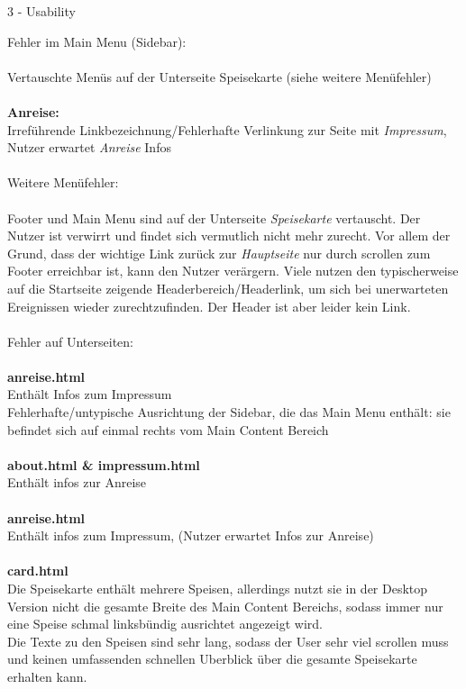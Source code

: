 \documentclass[a4paper]{article}
\begin{document}
\begin{exercise}{3 - Usability}
\begin{itemize}
{\Large Fehler im Main Menu (Sidebar):}\\\\
Vertauschte Menüs auf der Unterseite Speisekarte (siehe weitere Menüfehler)\\\\
\textbf{Anreise:}\\
Irreführende Linkbezeichnung/Fehlerhafte Verlinkung zur Seite mit \textit{Impressum}, Nutzer erwartet \textit{Anreise} Infos\\\\
{\Large Weitere Menüfehler:}\\\\
Footer und Main Menu sind auf der Unterseite \textit{Speisekarte} vertauscht. Der Nutzer ist verwirrt und findet sich vermutlich nicht mehr zurecht.
Vor allem der Grund, dass der wichtige Link zurück zur \textit{Hauptseite} nur durch scrollen zum Footer erreichbar ist, kann den Nutzer verärgern. Viele nutzen den typischerweise auf die Startseite zeigende Headerbereich/Headerlink, um sich bei unerwarteten Ereignissen wieder zurechtzufinden. Der Header ist aber leider kein Link.\\\\
{\Large Fehler auf Unterseiten:}\\\\
\textbf{anreise.html}\\
Enthält Infos zum Impressum\\
Fehlerhafte/untypische Ausrichtung der Sidebar, die das Main Menu enthält: sie befindet sich auf einmal rechts vom Main Content Bereich\\\\
\textbf{about.html \& impressum.html}\\
Enthält infos zur Anreise\\\\
\textbf{anreise.html }\\
Enthält infos zum Impressum, (Nutzer erwartet Infos zur Anreise)\\\\
\textbf{card.html}\\
Die Speisekarte enthält mehrere Speisen, allerdings nutzt sie in der Desktop Version nicht die gesamte Breite des Main Content Bereichs, sodass immer nur eine Speise schmal linksbündig ausrichtet angezeigt wird.\\
Die Texte zu den Speisen sind sehr lang, sodass der User sehr viel scrollen muss und keinen umfassenden schnellen Uberblick über die gesamte Speisekarte erhalten kann.



\end{itemize}
\end{exercise}
\end{document}
